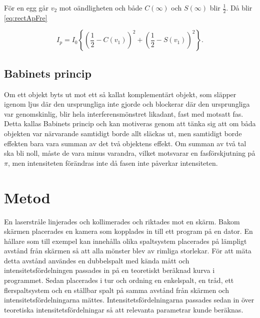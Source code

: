 \documentclass[a4paper]{article}
\begin{document}
För en egg går $v_2$ mot oändligheten och både $C(\infty)$ och $S(\infty)$ blir $\frac{1}{2}$. Då blir \eqref{eq:rectApFre}

\begin{equation}
	I_p = I_0 \left\{\left(\frac{1}{2} - C(v_1)\right)^2 + \left(\frac{1}{2} - S(v_1)\right)^2\right\}\text{.}
	\label{eq:diffEdge}
\end{equation}

\FloatBarrier

\subsection{Babinets princip}

Om ett objekt byts ut mot ett så kallat komplementärt objekt, som släpper igenom ljus där den ursprungliga inte gjorde och blockerar där den ursprungliga var genomskinlig, blir hela interferensmönstret likadant, fast med motsatt fas. Detta kallas Babinets princip och kan motiveras genom att tänka sig att om båda objekten var närvarande samtidigt borde allt släckas ut, men samtidigt borde effekten bara vara summan av det två objektens effekt. Om summan av två tal ska bli noll, måste de vara minus varandra, vilket motsvarar en fasförskjutning på $\pi$, men intensiteten förändras inte då fasen inte påverkar intensiteten.

\section{Metod}
  
  En laserstråle linjerades och kollimerades och riktades mot en skärm. Bakom skärmen placerades en kamera som kopplades in till ett program på en dator. En hållare som till exempel kan innehålla olika spaltsystem placerades på lämpligt avstånd från skärmen så att alla mönster blev av rimliga storlekar.
  För att mäta detta avstånd användes en dubbelspalt med kända mått och intensitetsfördelningen passades in på en teoretiskt beräknad kurva i programmet. Sedan placerades i tur och ordning en enkelspalt, en tråd, ett flerspaltsystem och en ställbar spalt på samma avstånd från skärmen och intensitetsfördelningarna mättes. Intensitetsfördelningarna passades sedan in över teoretiska intensitetsfördelningar så att relevanta parametrar kunde beräknas.
  
\end{document}
